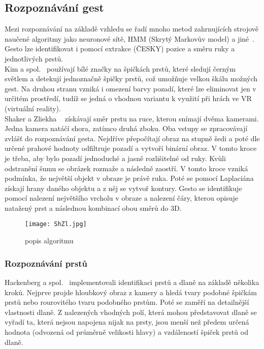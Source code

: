 \subsection{Rozpoznávání gest}
Mezi rozpoznávání na základě vzhledu se řadí mnoho metod zahrnujících strojově naučené algoritmy jako neuronové sítě, HMM (Skrytý Markovův model) a jiné~\cite{3}. Gesto lze identifikovat i pomocí extrakce (ČESKY) pozice a směru ruky a jednotlivých prstů.\\

Kim a spol.~\cite{5} používají bílé značky na špičkách prstů, které sledují černým světlem a detekují jednoznačně špičky prstů, což umožňuje velkou škálu možných gest. Na druhou stranu vzniká i omezení barvy pozadí, které lze eliminovat jen v určitém prostředí, tudíž se jedná o vhodnou variantu k využití při hrách ve VR (virtuální reality).\\

Shaker a Zliekha ~\cite{12} získávají směr prstu na ruce, kterou snímají dvěma kamerami. Jedna kamera natáčí shora, zatímco druhá zboku. Oba vstupy se zpracovávají zvlášť do rozpoznávání gesta. Nejdříve přepočítají obraz na stupně šedi a poté dle určené prahové hodnoty odfiltruje pozadí a vytvoří binární obraz. V tomto kroce je třeba, aby bylo pozadí jednoduché a jasně rozlišitelné od ruky. Kvůli odstranění šumu se obrázek rozmaže a následně zaostří. V tomto kroce vzniká podmínka, že největší objekt v obraze je právě ruka. Poté se pomocí Laplaciána získají hrany daného objektu a z něj se vytvoř kontury.
Gesto se identifikuje pomocí nalezení největšího vrcholu v obraze a nalezení čáry, kterou opisuje natažený prst a následnou kombinací obou směrů do 3D. 
\begin{figure}[h]
\centering
\texttt{[image: ShZl.jpg]}
\caption{popis algoritmu~\cite{12} } 
\end{figure}

\subsubsection{Rozpoznávání prstů}
Hackenberg a spol.~\cite{12} implementovali identifikaci prstů a dlaně na základě několika kroků. Nejprve projde hloubkový obraz z kamery a hledá tvary podobné špičkám prstů nebo rourovitého tvaru podobného prstům. Poté se zaměří na detailnější vlastnosti dlaně. Z nalezených vhodných polí, která mohou představovat dlaně se vyřadí ta, která nejsou napojena nijak na prsty, jsou menší než předem určená hodnota (odvozená od průměrně velikosti hlavy) a vzdáleností špiček prstů od dlaně.\\


